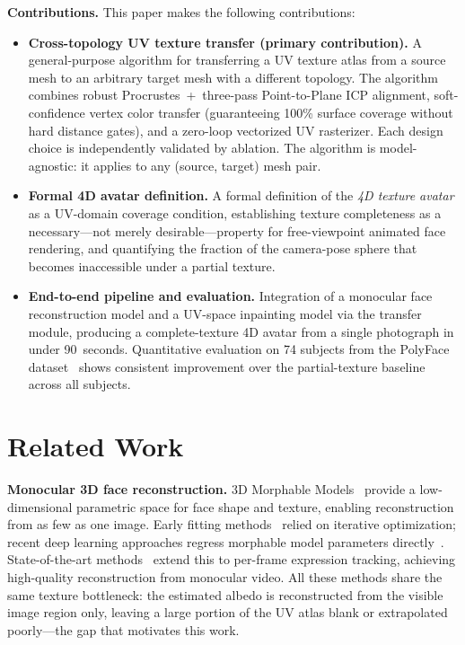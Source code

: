 \documentclass[conference]{IEEEtran}
\begin{document}
\medskip\noindent\textbf{Contributions.} This paper makes the following
contributions:
\begin{itemize}[leftmargin=*,nosep]
  \item \textbf{Cross-topology UV texture transfer (primary contribution).}
    A general-purpose algorithm for transferring a UV texture atlas from a
    source mesh to an arbitrary target mesh with a different topology.
    The algorithm combines robust Procrustes~+~three-pass Point-to-Plane ICP
    alignment, soft-confidence vertex color transfer (guaranteeing 100\% surface
    coverage without hard distance gates), and a zero-loop vectorized UV
    rasterizer. Each design choice is independently validated by ablation.
    The algorithm is model-agnostic: it applies to any (source, target) mesh
    pair.
  \item \textbf{Formal 4D avatar definition.}
    A formal definition of the \emph{4D texture avatar} as a UV-domain coverage
    condition, establishing texture completeness as a necessary---not merely
    desirable---property for free-viewpoint animated face rendering, and
    quantifying the fraction of the camera-pose sphere that becomes inaccessible
    under a partial texture.
  \item \textbf{End-to-end pipeline and evaluation.}
    Integration of a monocular face reconstruction model and a UV-space
    inpainting model via the transfer module, producing a complete-texture 4D
    avatar from a single photograph in under 90~seconds. Quantitative evaluation
    on 74 subjects from the PolyFace dataset~\cite{polyface} shows consistent
    improvement over the partial-texture baseline across all subjects.
\end{itemize}

\section{Related Work}

\medskip\noindent\textbf{Monocular 3D face reconstruction.}
3D Morphable Models~\cite{blanz1999morphable} provide a low-dimensional
parametric space for face shape and texture, enabling reconstruction from as
few as one image. Early fitting methods~\cite{paysan2009bfm} relied on
iterative optimization; recent deep learning approaches regress morphable model
parameters directly~\cite{tran2017regressing,deng2019accurate}.
State-of-the-art methods~\cite{feng2021deca,danecek2022emoca} extend this to
per-frame expression tracking, achieving high-quality reconstruction from
monocular video. All these methods share the same texture bottleneck: the
estimated albedo is reconstructed from the visible image region only, leaving a
large portion of the UV atlas blank or extrapolated poorly---the gap that
motivates this work.
\end{document}
